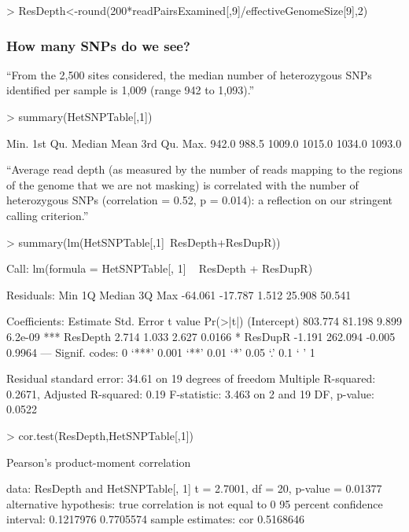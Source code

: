 \documentclass{article}
\begin{document}
\begin{Schunk}
\begin{Sinput}
> ResDepth<-round(200*readPairsExamined[,9]/effectiveGenomeSize[9],2)
\end{Sinput}
\end{Schunk}

\subsubsection{How many SNPs do we see?}

``From the 2,500 sites considered, the median number of heterozygous SNPs identified per sample is 1,009 (range 942 to 1,093).''

\begin{Schunk}
\begin{Sinput}
> summary(HetSNPTable[,1])
\end{Sinput}
\begin{Soutput}
   Min. 1st Qu.  Median    Mean 3rd Qu.    Max. 
  942.0   988.5  1009.0  1015.0  1034.0  1093.0 
\end{Soutput}
\end{Schunk}

``Average read depth (as measured by the number of reads mapping to the regions of the genome that we are not masking) is correlated with the number of heterozygous SNPs (correlation = 0.52, p = 0.014): a reflection on our stringent calling criterion.''

\begin{Schunk}
\begin{Sinput}
> summary(lm(HetSNPTable[,1]~ResDepth+ResDupR))
\end{Sinput}
\begin{Soutput}
Call:
lm(formula = HetSNPTable[, 1] ~ ResDepth + ResDupR)

Residuals:
    Min      1Q  Median      3Q     Max 
-64.061 -17.787   1.512  25.908  50.541 

Coefficients:
            Estimate Std. Error t value Pr(>|t|)    
(Intercept)  803.774     81.198   9.899  6.2e-09 ***
ResDepth       2.714      1.033   2.627   0.0166 *  
ResDupR       -1.191    262.094  -0.005   0.9964    
---
Signif. codes:  0 ‘***’ 0.001 ‘**’ 0.01 ‘*’ 0.05 ‘.’ 0.1 ‘ ’ 1

Residual standard error: 34.61 on 19 degrees of freedom
Multiple R-squared:  0.2671,	Adjusted R-squared:   0.19 
F-statistic: 3.463 on 2 and 19 DF,  p-value: 0.0522
\end{Soutput}
\begin{Sinput}
> cor.test(ResDepth,HetSNPTable[,1])
\end{Sinput}
\begin{Soutput}
	Pearson's product-moment correlation

data:  ResDepth and HetSNPTable[, 1]
t = 2.7001, df = 20, p-value = 0.01377
alternative hypothesis: true correlation is not equal to 0
95 percent confidence interval:
 0.1217976 0.7705574
sample estimates:
      cor 
0.5168646 
\end{Soutput}
\end{Schunk}
\end{document}
